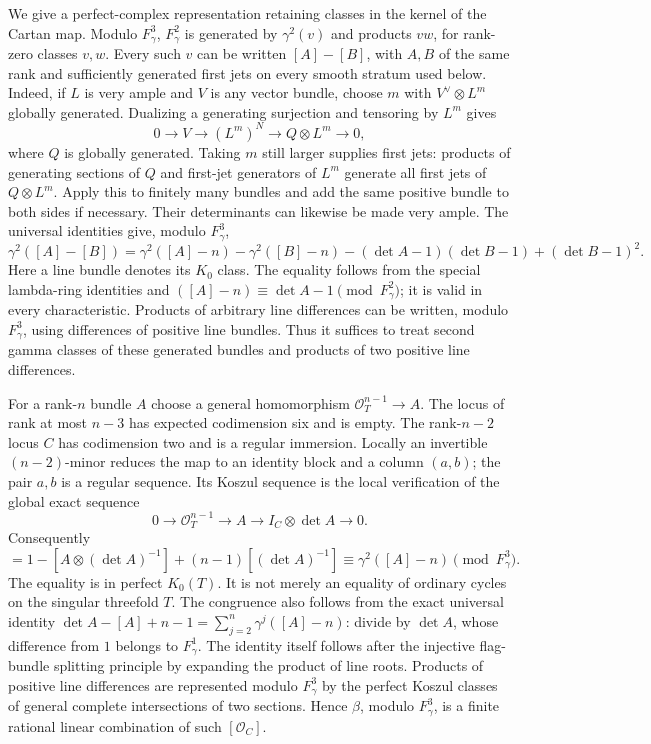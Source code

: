 We give a perfect-complex representation retaining classes in the
kernel of the Cartan map.  Modulo $F_\gamma^3$, $F_\gamma^2$ is
generated by $\gamma^2(v)$ and products $v w$, for rank-zero classes
$v,w$.  Every such $v$ can be written $[A]-[B]$, with $A,B$ of the
same rank and sufficiently generated first jets on every smooth
stratum used below.  Indeed, if $L$ is very ample and $V$ is any
vector bundle, choose $m$ with $V^\vee\otimes L^m$ globally generated.
Dualizing a generating surjection and tensoring by $L^m$ gives
\[
 0\longrightarrow V\longrightarrow (L^m)^N
       \longrightarrow Q\otimes L^m\longrightarrow0,
\]
where $Q$ is globally generated.  Taking $m$ still larger supplies
first jets: products of generating sections of $Q$ and first-jet
generators of $L^m$ generate all first jets of $Q\otimes L^m$.
Apply this to finitely many bundles and add the same positive bundle
to both sides if necessary.  Their determinants can likewise be
made very ample.  The universal identities give, modulo $F_\gamma^3$,
\[
 \gamma^2([A]-[B])
 =\gamma^2([A]-n)-\gamma^2([B]-n)
       -(\det A-1)(\det B-1)+(\det B-1)^2.
\]
Here a line bundle denotes its $K_0$ class.  The equality follows
from the special lambda-ring identities and
$([A]-n)\equiv\det A-1\pmod {F_\gamma^2}$; it is valid in every
characteristic.  Products of arbitrary line differences can be
written, modulo $F_\gamma^3$, using differences of positive line
bundles.  Thus it suffices to treat second gamma classes of these
generated bundles and products of two positive line differences.

For a rank-$n$ bundle $A$ choose a general homomorphism
$\mathcal O_T^{n-1}\to A$.  The locus of rank at most $n-3$ has
expected codimension six and is empty.  The rank-$n-2$ locus $C$
has codimension two and is a regular immersion.  Locally an
invertible $(n-2)$-minor reduces the map to an identity block and
a column $(a,b)$; the pair $a,b$ is a regular sequence.  Its Koszul
sequence is the local verification of the global exact sequence
\[
 0\longrightarrow\mathcal O_T^{n-1}\longrightarrow A
      \longrightarrow I_C\otimes\det A\longrightarrow0.
\]
Consequently
\begin{equation}
 [\mathcal O_C]
   =1-[A\otimes(\det A)^{-1}]+(n-1)[(\det A)^{-1}]
   \equiv\gamma^2([A]-n)\pmod {F_\gamma^3}.
                                                        \tag{EL.3}
\end{equation}
The equality is in perfect $K_0(T)$.  It is not merely an equality
of ordinary cycles on the singular threefold $T$.  The congruence
also follows from the exact universal identity
$\det A-[A]+n-1=\sum_{j=2}^n\gamma^j([A]-n)$: divide by
$\det A$, whose difference from $1$ belongs to $F_\gamma^1$.
The identity itself follows after the injective flag-bundle
splitting principle by expanding the product of line roots.
Products of positive line differences are represented modulo
$F_\gamma^3$ by the perfect Koszul classes of general complete
intersections of two sections.  Hence $\beta$, modulo $F_\gamma^3$,
is a finite rational linear combination of such $[\mathcal O_C]$.

